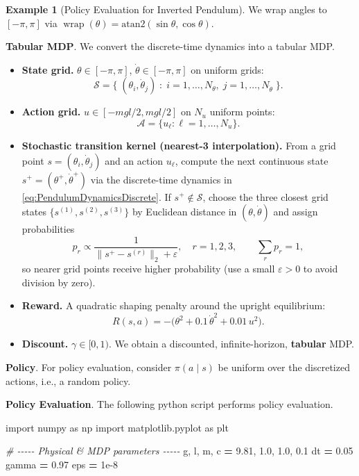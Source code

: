 \documentclass[
]{book}
\newenvironment{Shaded}{\begin{snugshade}}{\end{snugshade}}
\newcommand{\CommentTok}[1]{\textcolor[rgb]{0.56,0.35,0.01}{\textit{#1}}}
\newcommand{\FloatTok}[1]{\textcolor[rgb]{0.00,0.00,0.81}{#1}}
\newcommand{\ImportTok}[1]{#1}
\newcommand{\NormalTok}[1]{#1}
\newcommand{\OperatorTok}[1]{\textcolor[rgb]{0.81,0.36,0.00}{\textbf{#1}}}
\providecommand{\tightlist}{%
  \setlength{\itemsep}{0pt}\setlength{\parskip}{0pt}}
\theoremstyle{definition}
\theoremstyle{definition}
\newtheorem{example}{Example}[chapter]
\theoremstyle{definition}
\theoremstyle{definition}
\theoremstyle{remark}
\begin{document}
\begin{example}[Policy Evaluation for Inverted Pendulum]
We wrap angles to \([-\pi,\pi]\) via \(\operatorname{wrap}(\theta)=\mathrm{atan2}(\sin\theta,\cos\theta)\).

\textbf{Tabular MDP}. We convert the discrete-time dynamics into a tabular MDP.

\begin{itemize}
\tightlist
\item
  \textbf{State grid.} \(\theta \in [-\pi,\pi]\), \(\dot\theta \in [-\pi,\pi]\) on uniform grids:
  \[
  \mathcal{S}=\{\;(\theta_i,\dot\theta_j)\;:\; i=1,\dots,N_\theta,\; j=1, \dots, N_{\dot\theta}\;\}.
  \]
\item
  \textbf{Action grid.} \(u \in [-mgl/2, mgl/2]\) on \(N_u\) uniform points:
  \[
  \mathcal{A}=\{u_\ell:\ell=1,\dots,N_u\}.
  \]
\item
  \textbf{Stochastic transition kernel (nearest-3 interpolation).} From a grid point \(s=(\theta_i,\dot\theta_j)\) and an action \(u_\ell\),
  compute the next continuous state \(s^+ = (\theta^+,\dot\theta^+)\) via the discrete-time dynamics in \eqref{eq:PendulumDynamicsDiscrete}.
  If \(s^+\notin\mathcal{S}\), choose the three closest grid states
  \(\{s^{(1)},s^{(2)},s^{(3)}\}\) by Euclidean distance in \((\theta,\dot\theta)\) and assign
  probabilities
  \[
  p_r \propto \frac{1}{\|s^+ - s^{(r)}\|_2 + \varepsilon},\quad r=1,2,3,
  \qquad \sum_r p_r=1,
  \]
  so nearer grid points receive higher probability (use a small \(\varepsilon>0\) to avoid division by zero).
\item
  \textbf{Reward.} A quadratic shaping penalty around the upright equilibrium:
  \[
  R(s,a) = -\Big(\theta^2 + 0.1\,\dot\theta^2 + 0.01\,u^2\Big).
  \]
\item
  \textbf{Discount.} \(\gamma \in [0,1)\). We obtain a discounted, infinite-horizon, \textbf{tabular} MDP.
\end{itemize}

\textbf{Policy}. For policy evaluation, consider \(\pi(a\mid s)\) be uniform over the discretized actions, i.e., a random policy.

\textbf{Policy Evaluation}. The following python script performs policy evaluation.

\begin{Shaded}
\begin{Highlighting}[]
\ImportTok{import}\NormalTok{ numpy }\ImportTok{as}\NormalTok{ np}
\ImportTok{import}\NormalTok{ matplotlib.pyplot }\ImportTok{as}\NormalTok{ plt}

\CommentTok{\# {-}{-}{-}{-}{-} Physical \& MDP parameters {-}{-}{-}{-}{-}}
\NormalTok{g, l, m, c }\OperatorTok{=} \FloatTok{9.81}\NormalTok{, }\FloatTok{1.0}\NormalTok{, }\FloatTok{1.0}\NormalTok{, }\FloatTok{0.1}
\NormalTok{dt }\OperatorTok{=} \FloatTok{0.05}
\NormalTok{gamma }\OperatorTok{=} \FloatTok{0.97}
\NormalTok{eps }\OperatorTok{=} \FloatTok{1e{-}8}


\end{Highlighting}
\end{Shaded}
\end{example}
\end{document}
